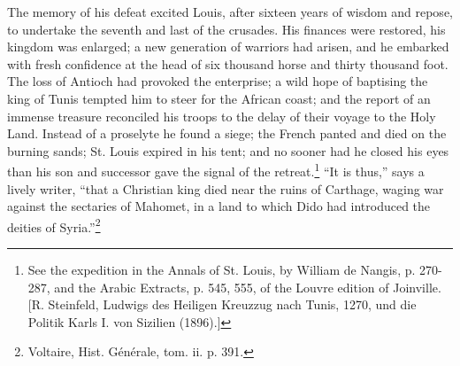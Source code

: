 The memory of his defeat excited Louis, after sixteen years of wisdom and repose, to undertake the seventh and last of the crusades. His finances were restored, his kingdom was enlarged; a new generation of warriors had arisen, and he embarked with fresh confidence at the head of six thousand horse and thirty thousand foot. The loss of Antioch had provoked the enterprise; a wild hope of baptising the king of Tunis tempted him to steer for the African coast; and the report of an immense treasure reconciled his troops to the delay of their voyage to the Holy Land. Instead of a proselyte he found a siege; the French panted and died on the burning sands; St. Louis expired in his tent; and no sooner had he closed his eyes than his son and successor gave the signal of the retreat.\footnote{See the expedition in the Annals of St. Louis, by William de Nangis, p. 270-287, and the Arabic Extracts, p. 545, 555, of the Louvre edition of Joinville. [R. Steinfeld, Ludwigs des Heiligen Kreuzzug nach Tunis, 1270, und die Politik Karls I. von Sizilien (1896).]} \texthebrew{“}It is thus,\texthebrew{}” says a lively writer, \texthebrew{“}that a Christian king died near the ruins of Carthage, waging war against the sectaries of Mahomet, in a land to which Dido had introduced the deities of Syria.\texthebrew{}”\footnote{Voltaire, Hist. Générale, tom. ii. p. 391.}

